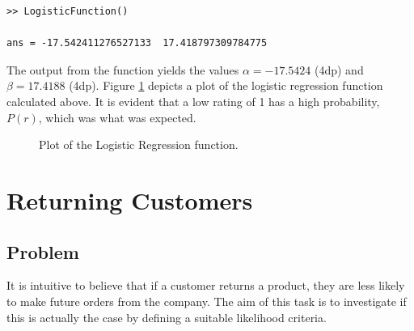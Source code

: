 \documentclass[11pt]{report}
\begin{document}
\begin{lstlisting}[title={Output of \texttt{LogisticFunction()}.}]
>> LogisticFunction()

ans = -17.542411276527133  17.418797309784775
\end{lstlisting}
 
The output from the function yields the values $\alpha=-17.5424$ (4dp) and $\beta=17.4188$ (4dp). Figure \ref{fig:logreg} depicts a plot of the logistic regression function calculated above. It is evident that a low rating of 1 has a high probability, $P(r)$, which was what was expected. 

\begin{figure}[h]
	\centering
	\noindent{}
  	\caption{Plot of the Logistic Regression function.}
  	\label{fig:logreg}
\end{figure}

\chapter{Returning Customers}
\section*{Problem}
It is intuitive to believe that if a customer returns a product, they are less likely to make future orders from the company. The aim of this task is to investigate if this is actually the case by defining a suitable likelihood criteria.
\end{document}
